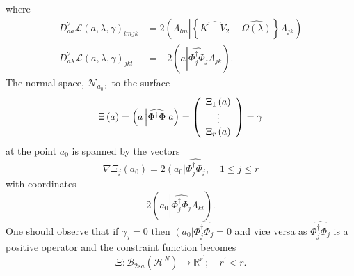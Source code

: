 \documentclass[aps,preprint]{revtex4}%
\begin{document}
where
\begin{align}
D_{aa}^{2}\mathcal{L}\left(  a,\lambda,\gamma\right)  _{lmjk}  &  =2\left(
\Lambda_{lm}\left\vert \left\{  \widehat{K+V_{2}}-\widehat{\Omega\left(
\lambda\right)  }\right\}  \right.  \Lambda_{jk}\right) \nonumber\\
D_{a\lambda}^{2}\mathcal{L}\left(  a,\lambda,\gamma\right)  _{jkl}  &
=-2\left(  a\left\vert \widehat{\Phi_{j}^{\dagger}\Phi_{j}}\right.
\Lambda_{jk}\right)  .
\end{align}
The normal space, $\mathcal{N}_{a_{0}},$ to the surface
\begin{equation}
\Xi\left(  a\right)  =\left(  a\left\vert \widehat{\Phi^{\dagger}\Phi}\right.
a\right)  =\left(
\begin{array}
[c]{c}%
\Xi_{1}\left(  a\right) \\
\vdots\\
\Xi_{r}\left(  a\right)
\end{array}
\right)  =\gamma
\end{equation}
at the point $a_{0}$ is spanned by the vectors
\begin{equation}
\nabla\Xi_{j}\left(  a_{0}\right)  =2\left(  \overset{}{a_{0}}\right\vert
\widehat{\Phi_{j}^{\dagger}\Phi_{j}},\quad1\leq j\leq r
\end{equation}
with coordinates
\begin{equation}
2\left(  a_{0}\left\vert \widehat{\Phi_{j}^{\dagger}\Phi_{j}}\right.
\Lambda_{kl}\right)  .
\end{equation}
One should observe that if $\gamma_{j}=0$ then $\left(  \overset{}{a_{0}%
}\right\vert \widehat{\Phi_{j}^{\dagger}\Phi_{j}}=0$ and vice versa as
$\widehat{\Phi_{j}^{\dagger}\Phi_{j}}$ is a positive operator and the
constraint function becomes
\begin{equation}
\Xi:\mathcal{B}_{2sa}\left(  \mathcal{H}^{N}\right)  \rightarrow
\mathbb{R}^{r^{\prime}};\quad r^{\prime}<r.
\end{equation}
\end{document}
